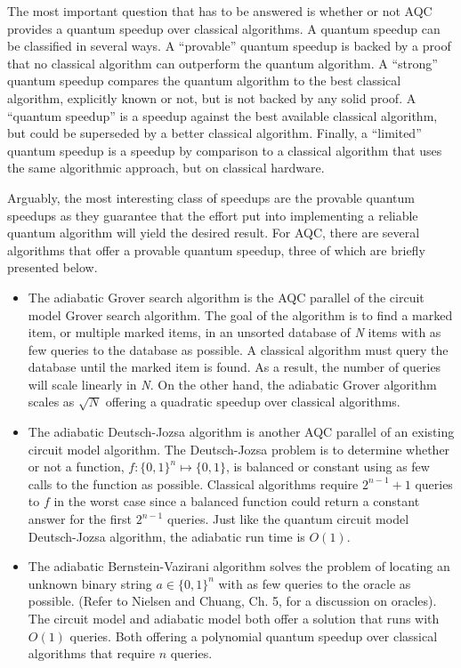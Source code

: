 \documentclass[%
 reprint,
 amsmath,amssymb,
 aps,
]{revtex4-1}
\begin{document}
   The most important question that has to be answered is whether or not AQC provides a quantum speedup over classical algorithms. A quantum speedup can be classified in several ways\cite{RevModPhys.90.015002}. A ``provable'' quantum speedup is backed by a proof that no classical algorithm can outperform the quantum algorithm. A ``strong'' quantum speedup compares the quantum algorithm to the best classical algorithm, explicitly known or not, but is not backed by any solid proof. A ``quantum speedup'' is a speedup against the best available classical algorithm, but could be superseded by a better classical algorithm. Finally, a ``limited'' quantum speedup is a speedup by comparison to a classical algorithm that uses the same algorithmic approach, but on classical hardware.
   
   Arguably, the most interesting class of speedups are the provable quantum speedups as they guarantee that the effort put into implementing a reliable quantum algorithm will yield the desired result. For AQC, there are several algorithms that offer a provable quantum speedup, three of which are briefly presented below.
   
   \begin{itemize}
   	\item The adiabatic Grover search algorithm is the AQC parallel of the circuit model Grover search algorithm. The goal of the algorithm is to find a marked item, or multiple marked items, in an unsorted database of \textit{N} items with as few queries to the database as possible. A classical algorithm must query the database until the marked item is found. As a result, the number of queries will scale linearly in \textit{N}. On the other hand, the adiabatic Grover algorithm scales as $\sqrt{N}$ offering a quadratic speedup over classical algorithms.
   \item The adiabatic Deutsch-Jozsa algorithm is another AQC parallel of an existing circuit model algorithm. The Deutsch-Jozsa problem is to determine whether or not a function, $f: \lbrace0,1\rbrace^n \longmapsto \lbrace0,1\rbrace$, is balanced or constant using as few calls to the function as possible. Classical algorithms require $2^{n-1} + 1$ queries to $f$ in the worst case since a balanced function could return a constant answer for the first $2^{n-1}$ queries. Just like the quantum circuit model Deutsch-Jozsa algorithm, the adiabatic run time is $O(1)$.
   \item The adiabatic Bernstein-Vazirani algorithm solves the problem of locating an unknown binary string $ a \in \lbrace0,1\rbrace^n  $ with as few queries to the oracle as possible. (Refer to Nielsen and Chuang, Ch. 5, for a discussion on oracles). The circuit model and adiabatic model both offer a solution that runs with $O(1)$ queries. Both offering a polynomial quantum speedup over classical algorithms that require $n$ queries.
   \end{itemize}
   
\end{document}
